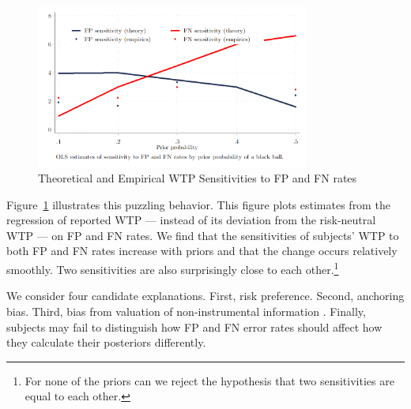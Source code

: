 \documentclass[12pt,a4paper]{article}
\begin{document}
\begin{figure}[H]
\centering
\caption{Theoretical and Empirical WTP Sensitivities to FP and FN rates} \label{fig:Comparison}
\includegraphics[width=0.8\textwidth]{Graphs/sensit_comparison.png}
\end{figure}

Figure~\ref{fig:Comparison} illustrates this puzzling behavior. This figure plots estimates from the regression of reported WTP --- instead of its deviation from the risk-neutral WTP --- on FP and FN rates. We find that the sensitivities of subjects' WTP to both FP and FN rates increase with priors and that the change occurs relatively smoothly. Two sensitivities are also surprisingly close to each other.\footnote{For none of the priors can we reject the hypothesis that two sensitivities are equal to each other.} 

We consider four candidate explanations. First, risk preference. Second, anchoring bias. Third, bias from valuation of non-instrumental information \citep{eliaz_paying_2010, masatlioglu_intrinsic_2017}. Finally, subjects may fail to distinguish how FP and FN error rates should affect how they calculate their posteriors differently. 

\end{document}
